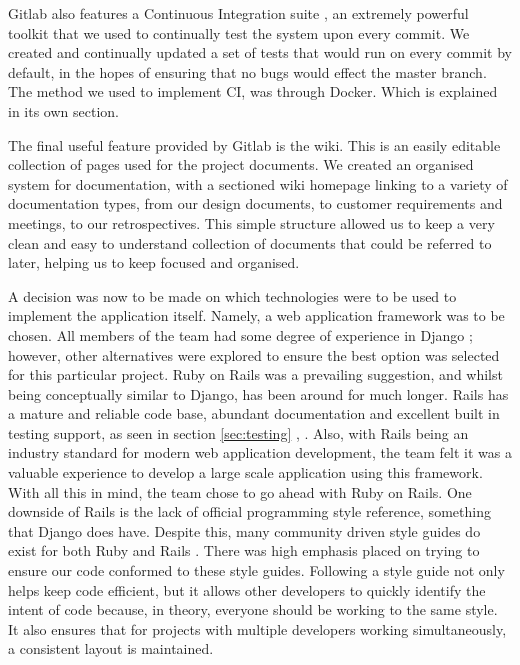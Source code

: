 \documentclass{l3proj}
\begin{document}
Gitlab also features a Continuous Integration suite \cite{ci}, an extremely powerful toolkit that we used to continually test the system upon every commit. We created and continually updated a set of tests that would run on every commit by default, in the hopes of ensuring that no bugs would effect the master branch. The method we used to implement CI, was through Docker. Which is explained in its own section.

The final useful feature provided by Gitlab is the wiki. This is an easily editable collection of pages used for the project documents. We created an organised system for documentation, with a sectioned wiki homepage linking to a variety of documentation types, from our design documents, to customer requirements and meetings, to our retrospectives. This simple structure allowed us to keep a very clean and easy to understand collection of documents that could be referred to later, helping us to keep focused and organised.

A decision was now to be made on which technologies were to be used to implement the application itself. Namely, a web application framework was to be chosen. All members of the team had some degree of experience in Django \cite{Django}; however, other alternatives were explored to ensure the best option was selected for this particular project. Ruby on Rails was a prevailing suggestion, and whilst being conceptually similar to Django, has been around for much longer. Rails has a mature and reliable code base, abundant documentation and excellent built in testing support, as seen in section \ref{sec:testing} \cite{Rails}, \cite{DjangoVsRails}. Also, with Rails being an industry standard for modern web application development, the team felt it was a valuable experience to develop a large scale application using this framework. With all this in mind, the team chose to go ahead with Ruby on Rails. One downside of Rails is the lack of official programming style reference, something that Django does have. Despite this, many community driven style guides do exist for both Ruby \cite{rubyStyle} and Rails \cite{railsStyle}. There was high emphasis placed on trying to ensure our code conformed to these style guides. Following a style guide not only helps keep code efficient, but it allows other developers to quickly identify the intent of code because, in theory, everyone should be working to the same style. It also ensures that for projects with multiple developers working simultaneously, a consistent layout is maintained.
\end{document}
